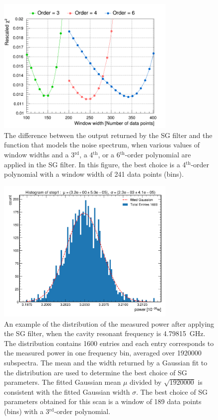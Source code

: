 \begin{figure} [htbp]
  \centering
  \includegraphics[width=8.6cm]{figures/chi2_Different_Order_Window_SGFilter.png}
  \caption{The difference between the output returned by the SG filter 
  and the function that models the noise spectrum, when various values of 
  window widths and 
  a 3$^\text{rd}$, a 4$^\text{th}$, or a 
  6$^\text{th}$-order polynomial are applied in the SG filter. In this 
  figure, the best choice is a 4$^\text{th}$-order polynomial with 
  a window width of 241 data points (bins). }
  \label{fig:sgoptimize}
\end{figure}
 


\begin{figure} [htbp]
  \centering
  \includegraphics[width=8.6cm]{figures/sysSG_temphistogram.png}
  \caption{An example of the distribution of the measured power after 
applying the SG filter, when 
the cavity resonant frequency is 4.79815~GHz. The distribution contains 
1600 entries and each entry corresponds to the measured power 
in one frequency bin, averaged
over 1920000 subspectra. The mean and the width returned by 
a Gaussian fit to the distribution are used to determine the best choice of 
SG parameters. The fitted Gaussian mean $\mu$ divided by 
$\sqrt{1920000}$ is consistent 
with the fitted Gaussian width $\sigma$. The best choice of SG parameters 
obtained for this scan is a window of 189 data points (bins) with a 
3$^\text{rd}$-order polynomial. 
}
  \label{fig:noisegauss}
\end{figure}
 

